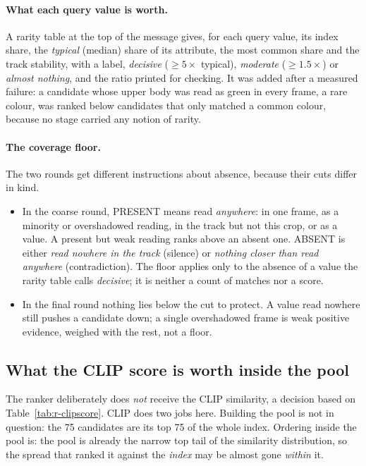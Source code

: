 \paragraph{What each query value is worth.} A rarity table at the top of the
message gives, for each query value, its index share, the \emph{typical} (median)
share of its attribute, the most common share and the track stability, with a
label, \emph{decisive} ($\geq 5\times$ typical), \emph{moderate}
($\geq 1.5\times$) or \emph{almost nothing}, and the ratio printed for checking. It
was added after a measured failure: a candidate whose upper body was read as green
in every frame, a rare colour, was ranked below candidates that only matched a
common colour, because no stage carried any notion of rarity.

\paragraph{The coverage floor.}
\label{sec:r-coverage}
The two rounds get different instructions about absence, because their cuts
differ in kind.

\begin{itemize}
\item In the coarse round, PRESENT means read \emph{anywhere}: in one frame, as a
      minority or overshadowed reading, in the track but not this crop, or as a
      \code{[near]} value. A present but weak reading ranks above an absent one.
      ABSENT is either \emph{read nowhere in the track} (silence) or \emph{nothing
      closer than \code{[far]} read anywhere} (contradiction). The floor applies
      only to the absence of a value the rarity table calls \emph{decisive}; it is
      neither a count of matches nor a score.
\item In the final round nothing lies below the cut to protect. A value read
      nowhere still pushes a candidate down; a single overshadowed frame is weak
      positive evidence, weighed with the rest, not a floor.
\end{itemize}

\subsection{What the CLIP score is worth inside the pool}
\label{sec:r-clipscore}
The ranker deliberately does \emph{not} receive the CLIP similarity, a decision
based on Table~\ref{tab:r-clipscore}. CLIP does two jobs here. Building the pool
is not in question: the 75 candidates are its top 75 of the whole index. Ordering
inside the pool is: the pool is already the narrow top tail of the similarity
distribution, so the spread that ranked it against the \emph{index} may be almost
gone \emph{within} it.

